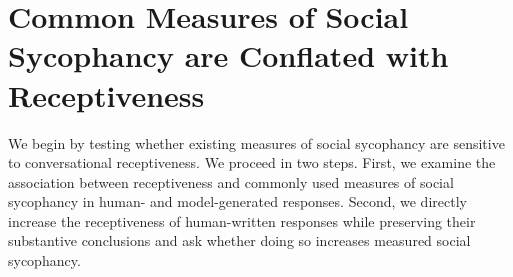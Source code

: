 \documentclass[letterpaper]{article} %
\newcommand{\cs}[1]{{\upshape[cite: #1]}}
\begin{document}




\section{Common Measures of Social Sycophancy are Conflated with Receptiveness}

We begin by testing whether existing measures of social sycophancy are sensitive to conversational receptiveness. We proceed in two steps. First, we examine the association between receptiveness and commonly used measures of social sycophancy in human- and model-generated responses. Second, we directly increase the receptiveness of human-written responses while preserving their substantive conclusions and ask whether doing so increases measured social sycophancy.
\end{document}
